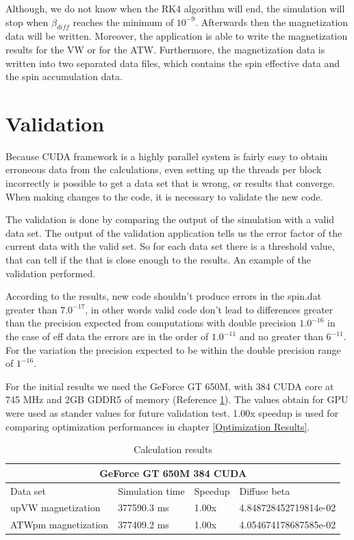 Although, we do not know when the RK4 algorithm will end, the simulation will stop when $\beta_{diff}$ reaches the minimum of $10^{-9}$. Afterwards then the magnetization data will be written. Moreover, the application is able to write the magnetization results for the VW or for the ATW. Furthermore, the magnetization data is written into two separated data files, which contains the spin effective data and the spin accumulation data.

\section{Validation}

Because CUDA framework is a highly parallel system is fairly easy to obtain erroneous data from the calculations, even setting up the threads per block incorrectly is possible to get a data set that is wrong, or results that converge. When making changes to the code, it is necessary to validate the new code.

The validation is done by comparing the output of the simulation with a valid data set. The output of the validation application tells us the error factor of the current data with the valid set. So for each data set there is a threshold value, that can tell if the that is close enough to the results. An example of the validation performed.

According to the results, new code shouldn't produce errors in the spin.dat greater than $7.0^{-17}$, in other words valid code don't lead to differences greater than the precision expected from computations with double precision $1.0^{-16}$ in the case of eff data the errors are in the order of $1.0^{-11}$ and no greater than $6^{-11}$. For the variation the precision expected to be within the double precision range of $1^{-16}$. 

For the initial results we used the GeForce GT 650M, with 384 CUDA core at 745 MHz and 2GB GDDR5 of memory (Reference \ref{tab:results}). The values obtain for GPU were used as stander values for  future validation test. 1.00x speedup is used for comparing optimization performances in chapter \ref{Optimization Results}.

\begin{table}[h]
\centering
\begin{tabular}{| l | l | l | l |}
\hline
\multicolumn{4}{|c|}{GeForce GT 650M  384 CUDA} \\
\hline
Data set & Simulation time & Speedup & Diffuse beta  \\
\hline
upVW magnetization & 377590.3 ms & 1.00x & 4.848728452719814e-02 \\
\hline
ATWpm magnetization & 377409.2 ms & 1.00x & 4.054674178687585e-02 \\
\hline
\end{tabular}
\caption{Calculation results}
\label{tab:results}
\end{table}


